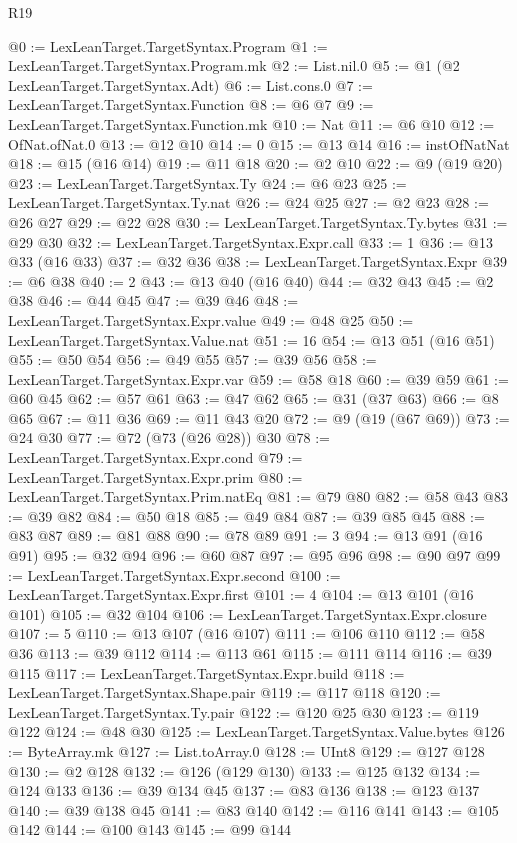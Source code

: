 \begin{lexlean}{R19}
\begin{coremodule}
@0 := LexLeanTarget.TargetSyntax.Program
@1 := LexLeanTarget.TargetSyntax.Program.mk
@2 := List.nil.{0}
@5 := @1 (@2 LexLeanTarget.TargetSyntax.Adt)
@6 := List.cons.{0}
@7 := LexLeanTarget.TargetSyntax.Function
@8 := @6 @7
@9 := LexLeanTarget.TargetSyntax.Function.mk
@10 := Nat
@11 := @6 @10
@12 := OfNat.ofNat.{0}
@13 := @12 @10
@14 := 0
@15 := @13 @14
@16 := instOfNatNat
@18 := @15 (@16 @14)
@19 := @11 @18
@20 := @2 @10
@22 := @9 (@19 @20)
@23 := LexLeanTarget.TargetSyntax.Ty
@24 := @6 @23
@25 := LexLeanTarget.TargetSyntax.Ty.nat
@26 := @24 @25
@27 := @2 @23
@28 := @26 @27
@29 := @22 @28
@30 := LexLeanTarget.TargetSyntax.Ty.bytes
@31 := @29 @30
@32 := LexLeanTarget.TargetSyntax.Expr.call
@33 := 1
@36 := @13 @33 (@16 @33)
@37 := @32 @36
@38 := LexLeanTarget.TargetSyntax.Expr
@39 := @6 @38
@40 := 2
@43 := @13 @40 (@16 @40)
@44 := @32 @43
@45 := @2 @38
@46 := @44 @45
@47 := @39 @46
@48 := LexLeanTarget.TargetSyntax.Expr.value
@49 := @48 @25
@50 := LexLeanTarget.TargetSyntax.Value.nat
@51 := 16
@54 := @13 @51 (@16 @51)
@55 := @50 @54
@56 := @49 @55
@57 := @39 @56
@58 := LexLeanTarget.TargetSyntax.Expr.var
@59 := @58 @18
@60 := @39 @59
@61 := @60 @45
@62 := @57 @61
@63 := @47 @62
@65 := @31 (@37 @63)
@66 := @8 @65
@67 := @11 @36
@69 := @11 @43 @20
@72 := @9 (@19 (@67 @69))
@73 := @24 @30
@77 := @72 (@73 (@26 @28)) @30
@78 := LexLeanTarget.TargetSyntax.Expr.cond
@79 := LexLeanTarget.TargetSyntax.Expr.prim
@80 := LexLeanTarget.TargetSyntax.Prim.natEq
@81 := @79 @80
@82 := @58 @43
@83 := @39 @82
@84 := @50 @18
@85 := @49 @84
@87 := @39 @85 @45
@88 := @83 @87
@89 := @81 @88
@90 := @78 @89
@91 := 3
@94 := @13 @91 (@16 @91)
@95 := @32 @94
@96 := @60 @87
@97 := @95 @96
@98 := @90 @97
@99 := LexLeanTarget.TargetSyntax.Expr.second
@100 := LexLeanTarget.TargetSyntax.Expr.first
@101 := 4
@104 := @13 @101 (@16 @101)
@105 := @32 @104
@106 := LexLeanTarget.TargetSyntax.Expr.closure
@107 := 5
@110 := @13 @107 (@16 @107)
@111 := @106 @110
@112 := @58 @36
@113 := @39 @112
@114 := @113 @61
@115 := @111 @114
@116 := @39 @115
@117 := LexLeanTarget.TargetSyntax.Expr.build
@118 := LexLeanTarget.TargetSyntax.Shape.pair
@119 := @117 @118
@120 := LexLeanTarget.TargetSyntax.Ty.pair
@122 := @120 @25 @30
@123 := @119 @122
@124 := @48 @30
@125 := LexLeanTarget.TargetSyntax.Value.bytes
@126 := ByteArray.mk
@127 := List.toArray.{0}
@128 := UInt8
@129 := @127 @128
@130 := @2 @128
@132 := @126 (@129 @130)
@133 := @125 @132
@134 := @124 @133
@136 := @39 @134 @45
@137 := @83 @136
@138 := @123 @137
@140 := @39 @138 @45
@141 := @83 @140
@142 := @116 @141
@143 := @105 @142
@144 := @100 @143
@145 := @99 @144

\end{coremodule}
\end{lexlean}
